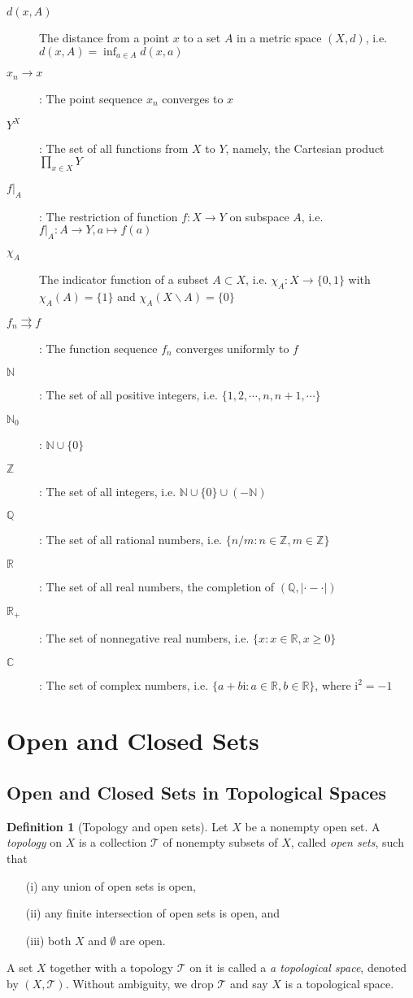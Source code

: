 \documentclass{article}
\numberwithin{equation}{section}
\theoremstyle{plain}
\theoremstyle{definition}
\newtheorem{definition}[theorem]{Definition}
\begin{document}
\begin{description}
	\item[$d(x,A)$] The distance from a point $x$ to a set $A$ in a metric space $(X,d)$, i.e. $d(x,A)=\inf_{a\in A}d(x,a)$
	\item[$x_n\to x$]: The point sequence $x_n$ converges to $x$
	\item[$Y^X$]: The set of all functions from $X$ to $Y$, namely, the Cartesian product $\prod_{x\in X}Y$
	\item[$f|_A$]: The restriction of function $f:X\to Y$ on subspace $A$, i.e. $f|_A:A\to Y, a\mapsto f(a)$
	\item[$\chi_A$] The indicator function of a subset $A\subset X$, i.e. $\chi_A:X\to\{0,1\}$ with $\chi_A(A)=\{1\}$ and $\chi_A(X\backslash A)=\{0\}$
	\item[$f_n\rightrightarrows f$]: The function sequence $f_n$ converges uniformly to $f$
	\item[$\mathbb{N}$]: The set of all positive integers, i.e. $\{1,2,\cdots,n,n+1,\cdots\}$
	\item[$\mathbb{N}_0$]: $\mathbb{N}\cup\{0\}$
	\item[$\mathbb{Z}$]: The set of all integers, i.e. $\mathbb{N}\cup\{0\}\cup(\mathbb{-\mathbb{N}})$
	\item[$\mathbb{Q}$]: The set of all rational numbers, i.e. $\{n/m:n\in\mathbb{Z},m\in\mathbb{Z}\}$
	\item[$\mathbb{R}$]: The set of all real numbers, the completion of $(\mathbb{Q},|\cdot - \cdot|)$
	\item[$\mathbb{R}_+$]: The set of nonnegative real numbers, i.e. $\{x:x\in\mathbb{R},x\geq 0\}$
	\item[$\mathbb{C}$]: The set of complex numbers, i.e. $\{a+b\mathrm{i}:a\in\mathbb{R},b\in\mathbb{R}\}$, where $\mathrm{i}^2=-1$
\end{description}
\newpage

\section{Open and Closed Sets}
\subsection{Open and Closed Sets in Topological Spaces}
\begin{definition}[Topology and open sets]\label{def:1.1}
Let $X$ be a nonempty open set. A \textit{topology} on $X$ is a collection $\mathscr{T}$ of nonempty subsets of $X$, called \textit{open sets}, such that
\begin{itemize}
	\item[(i)] any union of open sets is open,
	\item[(ii)] any finite intersection of open sets is open, and
	\item[(iii)] both $X$ and $\emptyset$ are open.
\end{itemize}
A set $X$ together with a topology $\mathscr{T}$ on it is called a \textit{a topological space}, denoted by $(X,\mathscr{T})$. Without ambiguity, we drop $\mathscr{T}$ and say $X$ is a topological space.
\end{definition}
\end{document}
